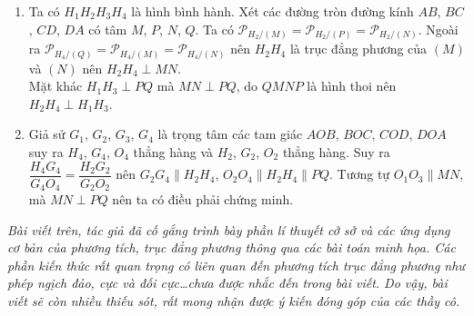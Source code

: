 \begin{bt}
{\begin{center}
		\end{center}
		
		\begin{enumerate}
			\item Ta có $H_1H_2H_3H_4$  là hình bình hành. Xét các đường tròn đường kính $AB$, $BC$, $CD$, $DA$ có tâm $M$, $P$, $N$, $Q$. Ta có  $\mathscr{P}_{H_2/(M)}=\mathscr{P}_{H_2/(P)}=\mathscr{P}_{H_2/(N)}$.
			Ngoài ra  $\mathscr{P}_{H_4/(Q)}=\mathscr{P}_{H_4/(M)}=\mathscr{P}_{H_4/(N)}$ nên $H_2H_4$  là trục đẳng phương của $(M)$ và $(N)$ nên  $H_2H_4 \perp MN$.\\
			Mặt khác  $H_1H_3 \perp PQ$  mà   $MN \perp PQ$, do $QMNP$ là hình thoi nên $H_2H_4  \perp H_1H_3$.
			
			
			\item Giả sử $G_1$, $G_2$, $G_3$, $G_4$  là trọng tâm các tam giác $AOB$, $BOC$, $COD$, $DOA$ suy ra $H_4$, $G_4$, $O_4$ thẳng hàng và  $H_2$, $G_2$, $O_2$ thẳng hàng. 
			Suy ra  $\dfrac{H_4G_4}{G_4O_4}=\dfrac{H_2G_2}{G_2O_2}$ nên $G_2G_4 \parallel H_2H_4$, $O_2O_4 \parallel H_2H_4  \parallel PQ$. Tương tự $O_1O_3 \parallel MN$, mà  $MN \perp PQ$  nên ta có điều phải chứng minh.
			
		\end{enumerate}
	}
\end{bt}


\textit{Bài viết trên, tác giả đã cố gắng trình bày phần lí thuyết cở sở và các ứng dụng cơ bản của phương tích, trục đẳng phương thông qua các bài toán minh họa. Các phần kiến thức rất quan trọng có liên quan đến phương tích trục đẳng phương như phép ngịch đảo, cực và đối cực…chưa được nhắc đến trong bài viết. Do vậy, bài viết sẽ còn nhiều thiếu sót, rất mong nhận được ý kiến đóng góp của các thầy cô.}

